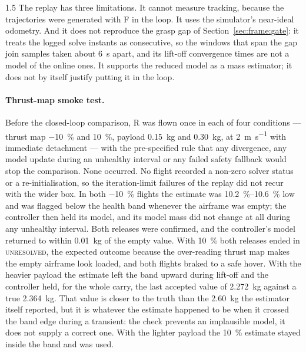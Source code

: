 \begin{spacing}{1.5}
The replay has three limitations. It cannot measure tracking, because the
trajectories were generated with F in the loop. It uses the simulator's
near-ideal odometry. And it does not reproduce the grasp gap of
Section~\ref{sec:frame:gate}: it treats the logged solve instants as
consecutive, so the windows that span the gap join samples taken about
\SI{6}{\second} apart, and its lift-off convergence times are not a model of the
online ones. It supports the
reduced model as a mass estimator; it does not by itself justify putting it in the
loop.

\paragraph{Thrust-map smoke test.} Before the closed-loop comparison, R was flown
once in each of four conditions --- thrust map \SI{-10}{\percent} and
\SI{+10}{\percent}, payload \SI{0.15}{\kg} and \SI{0.30}{\kg}, at
\SI{2}{\meter\per\second} with immediate detachment --- with the pre-specified
rule that any divergence, any model update during an unhealthy interval or any
failed safety fallback would stop the comparison. None occurred. No flight
recorded a non-zero solver status or a re-initialisation, so the iteration-limit
failures of the replay did not recur with the wider box. In both \SI{-10}{\percent}
flights the estimate was \SIrange{10.2}{10.6}{\percent} low and was flagged below
the health band whenever the airframe was empty; the controller then held its
model, and its model mass did not change at all during any unhealthy interval.
Both releases were confirmed, and the controller's model returned to within
\SI{0.01}{\kg} of the empty value. With \SI{+10}{\percent} both
releases ended in \textsc{unresolved}, the expected outcome because the
over-reading thrust map makes the empty airframe look loaded, and both flights
braked to a safe hover. With the heavier payload the estimate left the band
upward during lift-off and the controller held, for the whole carry, the last
accepted value of \SI{2.272}{\kg} against a true \SI{2.364}{\kg}. That value is
closer to the truth than the \SI{2.60}{\kg} the estimator itself reported, but
it is whatever the estimate happened to be when it crossed the band edge during a
transient: the check prevents an implausible model, it does not supply a correct
one. With the lighter payload the \SI{+10}{\percent} estimate stayed inside the
band and was used.


\end{spacing}
